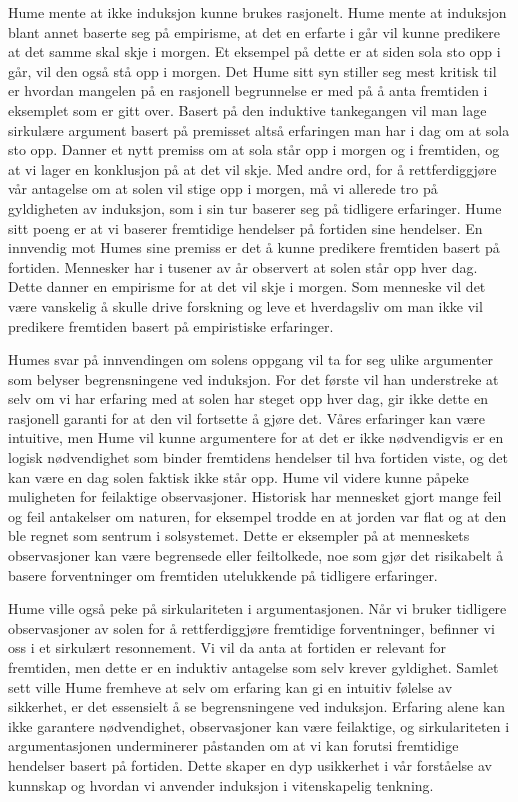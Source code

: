 \documentclass[
  letterpaper,
  DIV=11,
  numbers=noendperiod]{scrreprt}
\begin{document}
\hfill\break
Hume mente at ikke induksjon kunne brukes rasjonelt. Hume mente at
induksjon blant annet baserte seg på empirisme, at det en erfarte i går
vil kunne predikere at det samme skal skje i morgen. Et eksempel på
dette er at siden sola sto opp i går, vil den også stå opp i morgen. Det
Hume sitt syn stiller seg mest kritisk til er hvordan mangelen på en
rasjonell begrunnelse er med på å anta fremtiden i eksemplet som er gitt
over. Basert på den induktive tankegangen vil man lage sirkulære
argument basert på premisset altså erfaringen man har i dag om at sola
sto opp. Danner et nytt premiss om at sola står opp i morgen og i
fremtiden, og at vi lager en konklusjon på at det vil skje. Med andre
ord, for å rettferdiggjøre vår antagelse om at solen vil stige opp i
morgen, må vi allerede tro på gyldigheten av induksjon, som i sin tur
baserer seg på tidligere erfaringer. Hume sitt poeng er at vi baserer
fremtidige hendelser på fortiden sine hendelser. En innvendig mot Humes
sine premiss er det å kunne predikere fremtiden basert på fortiden.
Mennesker har i tusener av år observert at solen står opp hver dag.
Dette danner en empirisme for at det vil skje i morgen. Som menneske vil
det være vanskelig å skulle drive forskning og leve et hverdagsliv om
man ikke vil predikere fremtiden basert på empiristiske erfaringer.

Humes svar på innvendingen om solens oppgang vil ta for seg ulike
argumenter som belyser begrensningene ved induksjon. For det første vil
han understreke at selv om vi har erfaring med at solen har steget opp
hver dag, gir ikke dette en rasjonell garanti for at den vil fortsette å
gjøre det. Våres erfaringer kan være intuitive, men Hume vil kunne
argumentere for at det er ikke nødvendigvis er en logisk nødvendighet
som binder fremtidens hendelser til hva fortiden viste, og det kan være
en dag solen faktisk ikke står opp. Hume vil videre kunne påpeke
muligheten for feilaktige observasjoner. Historisk har mennesket gjort
mange feil og feil antakelser om naturen, for eksempel trodde en at
jorden var flat og at den ble regnet som sentrum i solsystemet. Dette er
eksempler på at menneskets observasjoner kan være begrensede eller
feiltolkede, noe som gjør det risikabelt å basere forventninger om
fremtiden utelukkende på tidligere erfaringer.

Hume ville også peke på sirkulariteten i argumentasjonen. Når vi bruker
tidligere observasjoner av solen for å rettferdiggjøre fremtidige
forventninger, befinner vi oss i et sirkulært resonnement. Vi vil da
anta at fortiden er relevant for fremtiden, men dette er en induktiv
antagelse som selv krever gyldighet. Samlet sett ville Hume fremheve at
selv om erfaring kan gi en intuitiv følelse av sikkerhet, er det
essensielt å se begrensningene ved induksjon. Erfaring alene kan ikke
garantere nødvendighet, observasjoner kan være feilaktige, og
sirkulariteten i argumentasjonen underminerer påstanden om at vi kan
forutsi fremtidige hendelser basert på fortiden. Dette skaper en dyp
usikkerhet i vår forståelse av kunnskap og hvordan vi anvender induksjon
i vitenskapelig tenkning.
\end{document}
